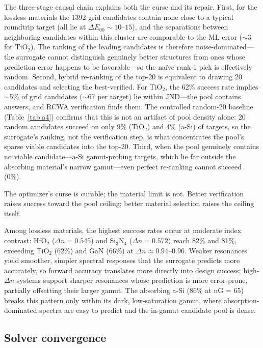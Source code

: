 \documentclass[10pt,twocolumn]{article}
\begin{document}
The three-stage causal chain explains both the curse and its repair. First, for the lossless materials the 1392 grid candidates contain none close to a typical roundtrip target (all lie at $\Delta E_{00} \sim 10$--$15$), and the separations between neighboring candidates within this cluster are comparable to the ML error ($\sim$3 for TiO$_2$). The ranking of the leading candidates is therefore noise-dominated---the surrogate cannot distinguish genuinely better structures from ones whose prediction error happens to be favorable---so the na\"ive rank-1 pick is effectively random. Second, hybrid re-ranking of the top-20 is equivalent to drawing 20 candidates and selecting the best-verified. For TiO$_2$, the 62\% success rate implies $\sim$5\% of grid candidates ($\sim$67 per target) lie within JND---the pool contains answers, and RCWA verification finds them. The controlled random-20 baseline (Table~\ref{tab:a4}) confirms that this is not an artifact of pool density alone: 20 random candidates succeed on only 9\% (TiO$_2$) and 4\% (a-Si) of targets, so the surrogate's ranking, not the verification step, is what concentrates the pool's sparse viable candidates into the top-20. Third, when the pool genuinely contains no viable candidate---a-Si gamut-probing targets, which lie far outside the absorbing material's narrow gamut---even perfect re-ranking cannot succeed (0\%).

The optimizer's curse is curable; the material limit is not. Better verification raises success toward the pool ceiling; better material selection raises the ceiling itself.

Among lossless materials, the highest success rates occur at moderate index contrast: HfO$_2$ ($\Delta n = 0.545$) and Si$_3$N$_4$ ($\Delta n = 0.572$) reach 82\% and 81\%, exceeding TiO$_2$ (62\%) and GaN (66\%) at $\Delta n \approx 0.94$--0.96. Weaker resonances yield smoother, simpler spectral responses that the surrogate predicts more accurately, so forward accuracy translates more directly into design success; high-$\Delta n$ systems support sharper resonances whose prediction is more error-prone, partially offsetting their larger gamut. The absorbing a-Si (86\% at nG = 65) breaks this pattern only within its dark, low-saturation gamut, where absorption-dominated spectra are easy to predict and the in-gamut candidate pool is dense.

\subsection{Solver convergence}
\label{sec:convergence}
\end{document}
